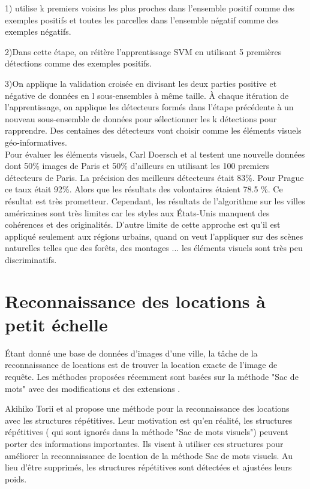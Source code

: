 \documentclass[journal]{IEEEtran}
\begin{document}
1) utilise k premiers voisins les plus proches dans l'ensemble positif comme des 
exemples positifs et toutes les parcelles dans l'ensemble négatif comme des exemples 
négatifs.

2)Dans cette étape, on réitère l'apprentissage SVM en utilisant 5 premières 
détections comme des exemples positifs.

3)On applique la validation croisée en divisant les deux parties positive et 
négative de données en l sous-ensembles à même taille. À chaque itération de 
l'apprentissage, on applique les détecteurs formés dans l'étape précédente à un 
nouveau sous-ensemble de données pour sélectionner les k détections pour 
rapprendre. Des centaines des détecteurs vont choisir comme les éléments 
visuels géo-informatives.\\

Pour évaluer les éléments visuels, Carl Doersch et al testent une nouvelle données dont 
50\% images de Paris et 50\% d'ailleurs en utilisant les 100 premiers détecteurs de
Paris. La précision des meilleurs détecteurs était 83\%. Pour Prague ce taux
était 92\%. Alors que les résultats des volontaires étaient 78.5 \%. Ce résultat est très 
prometteur. Cependant, les résultats de l'algorithme sur les villes américaines sont très 
limites car les styles aux États-Unis manquent des cohérences et des originalités. 
D'autre limite de cette approche est qu'il est appliqué seulement aux régions urbains, 
quand on veut l'appliquer sur des scènes naturelles telles que des forêts, des montages 
... les éléments visuels sont très peu discriminatifs. 


\section{Reconnaissance des locations à petit échelle}
Étant donné une base de données d'images d'une ville, la tâche de la reconnaissance de 
locations est de trouver la location exacte de l'image de requête. Les méthodes proposées 
récemment sont basées sur la méthode "Sac de mots" avec des modifications et 
des extensions \cite{torii2013visual, sattler2012improving, cao2013graph}.

Akihiko Torii et al \cite{torii2013visual} propose une méthode pour la reconnaissance des 
locations avec les structures répétitives. Leur motivation est qu'en réalité, les 
structures répétitives ( qui sont ignorés dans la méthode "Sac de mots visuels") peuvent 
porter des informations importantes. Ils visent à utiliser ces structures 
pour améliorer la reconnaissance de location de la méthode Sac de mots visuels. Au lieu 
d'être supprimés, les structures répétitives sont détectées et ajustées leurs poids. 
\end{document}
